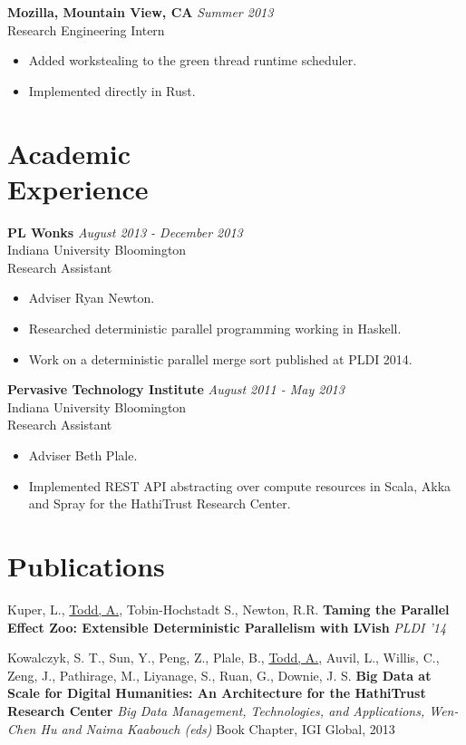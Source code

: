 \documentclass[margin]{res}
\begin{document}
\begin{resume}
 {\bf Mozilla, Mountain View, CA} \hfill \textit{Summer 2013} \\
 Research Engineering Intern
 \begin{itemize} \itemsep -2pt  %
 \item Added workstealing to the green thread runtime scheduler.
 \item Implemented directly in Rust.
 \end{itemize}
  
\section{Academic \\ Experience}

 {\bf PL Wonks} \hfill \textit{August 2013 - December 2013} \\
 Indiana University Bloomington \\
 Research Assistant
 \begin{itemize} \itemsep -2pt  %
 \item Adviser Ryan Newton.
 \item Researched deterministic parallel programming working in Haskell.
 \item Work on a deterministic parallel merge sort published at PLDI 2014.
 \end{itemize}


 {\bf Pervasive Technology Institute} \hfill \textit{August 2011 - May 2013} \\
 Indiana University Bloomington \\
 Research Assistant
 \begin{itemize} \itemsep -2pt  %
 \item Adviser Beth Plale.
 \item Implemented REST API abstracting over compute resources in Scala, Akka and Spray for the HathiTrust Research Center.
 \end{itemize}
 
\section{Publications}

Kuper, L., \underline{Todd, A.}, Tobin-Hochstadt S., Newton, R.R. {\bf Taming the Parallel Effect Zoo: Extensible Deterministic Parallelism with LVish} \textit{PLDI '14} 

Kowalczyk, S. T., Sun, Y., Peng, Z., Plale, B., \underline{Todd, A.}, Auvil, L., Willis, C., Zeng, J., Pathirage, M., Liyanage, S., Ruan, G., Downie, J. S. {\bf Big Data at Scale for Digital Humanities: An Architecture for the HathiTrust Research Center} \textit{Big Data Management, Technologies, and Applications, Wen-Chen Hu and Naima Kaabouch (eds)} Book Chapter, IGI Global, 2013


\end{resume}
\end{document}
